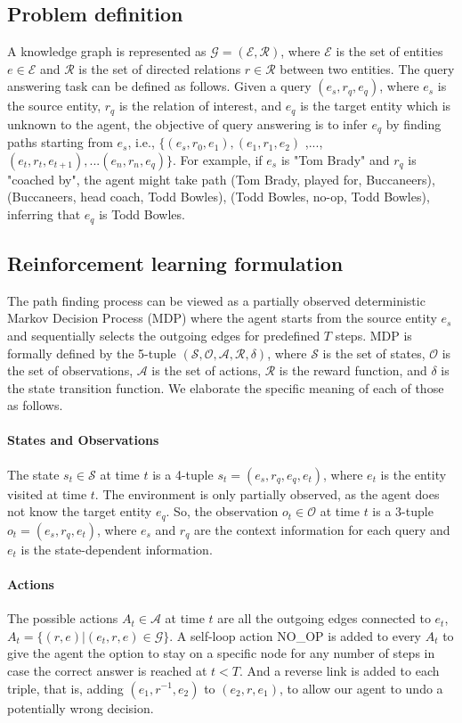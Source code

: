 \documentclass[lettersize,journal]{IEEEtran}
\begin{document}
\subsection{Problem definition}
A knowledge graph is represented as $\mathcal{G}=(\mathcal{E},\mathcal{R})$, where $\mathcal{E}$ is the set of entities $e \in \mathcal{E}$ and $\mathcal{R}$ is the set of directed relations $r \in \mathcal{R}$ between two entities. The query answering task can be defined as follows. Given a query $(e_s, r_q, e_q)$, where $e_s$ is the source entity, $r_q$ is the relation of interest, and $e_q$ is the target entity which is unknown to the agent, the objective of query answering is to infer $e_q$ by finding paths starting from $e_s$, i.e., $\{(e_s,r_0,e_1), (e_1,r_1,e_2)$ ,..., $(e_t,r_t,e_{t+1}), ...(e_n,r_n,e_q)\}$. For example, if $e_s$ is "Tom Brady" and $r_q$ is "coached by", the agent might take path {(Tom Brady, played for, Buccaneers), (Buccaneers, head coach, Todd Bowles), (Todd Bowles, no-op, Todd Bowles)}, inferring that $e_q$ is Todd Bowles. 

\subsection{Reinforcement learning formulation}
The path finding process can be viewed as a partially observed deterministic Markov Decision Process (MDP) where the agent starts from the source entity $e_s$ and sequentially selects the outgoing edges for predefined $T$ steps. MDP is formally defined by the 5-tuple $(\mathcal{S}, \mathcal{O}, \mathcal{A}, \mathcal{R}, \delta)$, where $\mathcal{S}$ is the set of states, $\mathcal{O}$ is the set of observations, $\mathcal{A}$ is the set of actions, $\mathcal{R}$ is the reward function, and $\delta$ is the state transition function. We elaborate the specific meaning of each of those as follows.
\paragraph{States and Observations}
The state $s_t \in \mathcal{S}$ at time $t$ is a 4-tuple $s_t = (e_s,r_q,e_q,e_t)$, where $e_t$ is the entity visited at time $t$. The environment is only partially observed, as the agent does not know the target entity $e_q$. So, the observation $o_t \in \mathcal{O}$ at time $t$ is a 3-tuple $o_t =(e_s,r_q,e_t)$, where $e_s$ and $r_q$ are the context information for each query and $e_t$ is the state-dependent information.
\paragraph{Actions}
The possible actions $A_t \in \mathcal{A}$ at time $t$ are all the outgoing edges connected to $e_t$, $A_t=\{(r,e)|(e_t,r,e) \in \mathcal{G} \}$. A self-loop action NO\_OP is added to every $A_t$ to give the agent the option to stay on a specific node for any number of steps in case the correct answer is reached at $t<T$. And a reverse link is added to each triple, that is, adding $(e_1,r^{-1},e_2)$ to $(e_2,r,e_1)$, to allow our agent to undo a potentially wrong decision.
\end{document}
